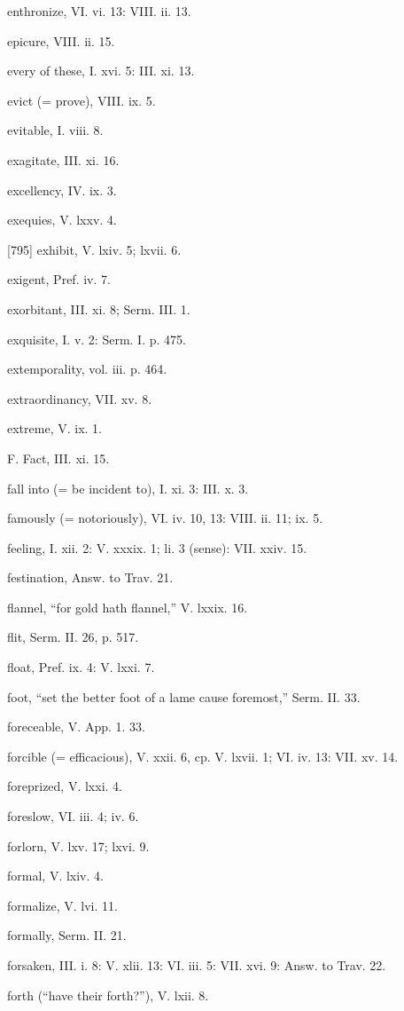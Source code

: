 enthronize, VI. vi. 13: VIII. ii. 13.

epicure, VIII. ii. 15.

every of these, I. xvi. 5: III. xi. 13.

evict (= prove), VIII. ix. 5.

evitable, I. viii. 8.

exagitate, III. xi. 16.

excellency, IV. ix. 3.

exequies, V. lxxv. 4.

[795]
exhibit, V. lxiv. 5; lxvii. 6.

exigent, Pref. iv. 7.

exorbitant, III. xi. 8; Serm. III. 1.

exquisite, I. v. 2: Serm. I. p. 475.

extemporality, vol. iii. p. 464.

extraordinancy, VII. xv. 8.

extreme, V. ix. 1.

F.
Fact, III. xi. 15.

fall into (= be incident to), I. xi. 3: III. x. 3.

famously (= notoriously), VI. iv. 10, 13: VIII. ii. 11; ix. 5.

feeling, I. xii. 2: V. xxxix. 1; li. 3 (sense): VII. xxiv. 15.

festination, Answ. to Trav. 21.

flannel, “for gold hath flannel,” V. lxxix. 16.

flit, Serm. II. 26, p. 517.

float, Pref. ix. 4: V. lxxi. 7.

foot, “set the better foot of a lame cause foremost,” Serm. II. 33.

foreceable, V. App. 1. 33.

forcible (= efficacious), V. xxii. 6, cp. V. lxvii. 1; VI. iv. 13: VII. xv. 14.

foreprized, V. lxxi. 4.

foreslow, VI. iii. 4; iv. 6.

forlorn, V. lxv. 17; lxvi. 9.

formal, V. lxiv. 4.

formalize, V. lvi. 11.

formally, Serm. II. 21.

forsaken, III. i. 8: V. xlii. 13: VI. iii. 5: VII. xvi. 9: Answ. to Trav. 22.

forth (“have their forth?”), V. lxii. 8.

